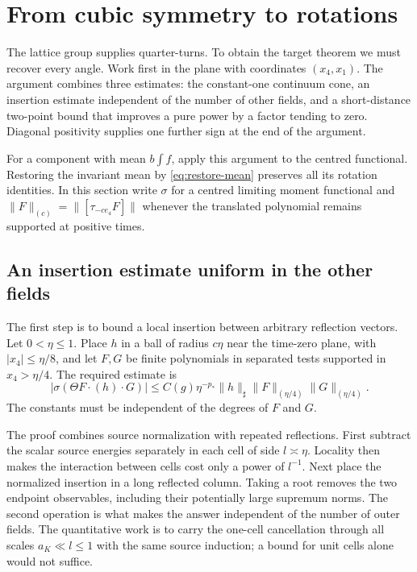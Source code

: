\documentclass[11pt,letterpaper,reqno]{amsart}
\theoremstyle{definition}
\theoremstyle{remark}
\begin{document}
\section{From cubic symmetry to rotations}\label{sec:rotations}

The lattice group supplies quarter-turns. To obtain the target theorem
we must recover every angle. Work first in the plane with coordinates $(x_4,x_1)$.
The argument combines three estimates: the
constant-one continuum cone, an insertion estimate independent of
the number of other fields, and a short-distance two-point bound
that improves a pure power by a factor tending to zero. Diagonal
positivity supplies one further sign at the end of the argument.

For a component with mean $b\int f$, apply this argument to the
centred functional. Restoring the invariant mean by
\eqref{eq:restore-mean} preserves all its rotation identities.
In this section write $\sigma$ for a centred limiting moment
functional and $\|F\|_{(c)}=\|[\tau_{-ce_4}F]\|$ whenever the
translated polynomial remains supported at positive times.

\subsection{An insertion estimate uniform in the other fields}

\label{hyp:insertion-bound}
The first step is to bound a local insertion between arbitrary
reflection vectors. Let $0<\eta\le1$. Place $h$ in a ball of radius $c\eta$ near the
time-zero plane, with $|x_4|\le\eta/8$, and let $F,G$ be finite
polynomials in separated tests supported in $x_4>\eta/4$. The
required estimate is
\begin{equation}\label{eq:rotation-insertion}
 |\sigma(\Theta F\cdot(h)\cdot G)|
 \le C(g)\eta^{-p_*}\|h\|_\sharp
                    \|F\|_{(\eta/4)}\|G\|_{(\eta/4)}.
\end{equation}
The constants must be independent of the degrees of $F$ and $G$.

The proof combines source normalization with repeated reflections. First
subtract the scalar source energies separately in each cell of side
$l\asymp\eta$. Locality then makes the interaction between cells cost
only a power of $l^{-1}$. Next place the normalized insertion in a long
reflected column. Taking a root removes the two endpoint observables,
including their potentially large supremum norms. The second operation
is what makes the answer independent of the number of outer fields.
The quantitative work is to carry the one-cell cancellation through
all scales $a_K\ll l\le1$ with the same source induction; a bound for
unit cells alone would not suffice.
\end{document}
